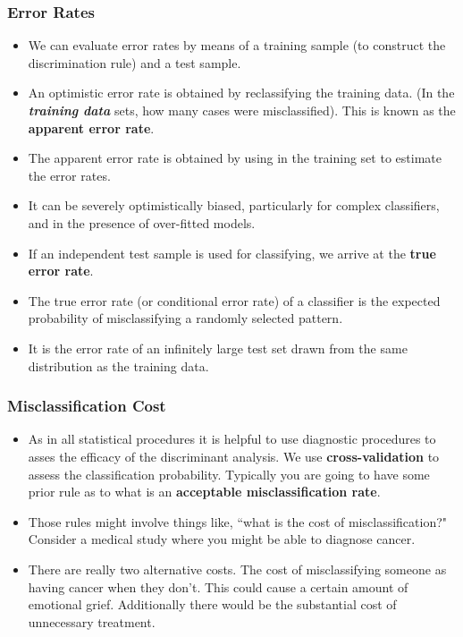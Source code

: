 \documentclass[PredictiveAnalytics101.tex]{subfiles}
\begin{document}
\begin{frame}
\frametitle{Error Rates}
\begin{itemize}
\item We can evaluate error rates by means of a training sample (to construct the discrimination rule) and a test sample.


\item An optimistic error rate is obtained by reclassifying the training data. (In the \textbf{\textit{training data}} sets, how many cases were misclassified). This is known as the \textbf{apparent error rate}.


\item The apparent error rate is obtained by using in the training set to estimate
the error rates.
\item It can be severely optimistically biased, particularly for complex classifiers, and in the presence of over-fitted models.
\end{itemize}

\end{frame}
\begin{frame}
\begin{itemize}
\item If an independent test sample is used for classifying, we arrive at the  \textbf{true error rate}.
\item The true error rate (or conditional error rate) of a classifier is the expected
probability of misclassifying a randomly selected pattern.
\item It is the error rate of an infinitely large test set drawn from the same distribution as the training data.
\end{itemize}


\end{frame}
\begin{frame}
\frametitle{Misclassification Cost}
\begin{itemize}
\item As in all statistical procedures it is helpful to use diagnostic procedures to asses the efficacy of the discriminant analysis. We use \textbf{cross-validation} to assess the classification probability.
Typically you are going to have some prior rule as to what is an \textbf{acceptable misclassification rate}.

\item Those rules might involve things like, ``what is the cost of misclassification?" Consider a medical study where you might be able to diagnose cancer.

\item There are really two alternative costs. The cost of misclassifying someone as having cancer when they don't.
This could cause a certain amount of emotional grief. Additionally there would be the substantial cost of unnecessary treatment.
\end{itemize}


\end{frame}
\end{document}
